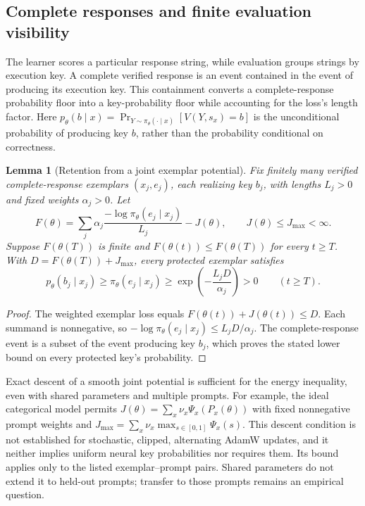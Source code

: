 \documentclass{article}
\newcommand{\enforcehalffinalproseline}{%
  \setlength{\parfillskip}{0pt plus .20\linewidth}}
\newcommand{\1}{\mathbf 1}
\newtheorem{lemma}{Lemma}[section]
\theoremstyle{remark}
\theoremstyle{definition}
\theoremstyle{plain}
\begin{document}
\subsection{Complete responses and finite evaluation visibility}
\label{app:theory-exemplar-bridge}

The learner scores a particular response string, while evaluation groups
strings by execution key. A complete verified response is an event contained in the event of
producing its execution key. This containment converts a complete-response
probability floor into a key-probability floor while accounting for the
loss's length factor. Here
$p_\theta(b\mid x)=\Pr_{Y\sim\pi_\theta(\cdot\mid x)}[V(Y,s_x)=b]$
is the unconditional probability of producing key $b$, rather than the
probability conditional on correctness.

\begin{lemma}[Retention from a joint exemplar potential]
\enforcehalffinalproseline
\label{lem:shared-exemplar-retention}
Fix finitely many verified complete-response exemplars $(x_j,e_j)$, each
realizing key $b_j$, with lengths $L_j>0$ and fixed weights $\alpha_j>0$.
Let
\[
 F(\theta)=\sum_j\alpha_j
 \frac{-\log\pi_\theta(e_j\mid x_j)}{L_j}-J(\theta),
 \qquad J(\theta)\le J_{\max}<\infty.
\]
Suppose $F(\theta(T))$ is finite and
$F(\theta(t))\le F(\theta(T))$ for every $t\ge T$. With
$D=F(\theta(T))+J_{\max}$, every protected exemplar satisfies
\[
 p_\theta(b_j\mid x_j)\ge\pi_\theta(e_j\mid x_j)
 \ge\exp\!\left(-\frac{L_jD}{\alpha_j}\right)>0
 \qquad(t\ge T).
\]
\end{lemma}
\begin{proof}
\enforcehalffinalproseline
The weighted exemplar loss equals $F(\theta(t))+J(\theta(t))\le D$.
Each summand is nonnegative, so
$-\log\pi_\theta(e_j\mid x_j)\le L_jD/\alpha_j$.
The complete-response event is a subset of the event producing key $b_j$,
which proves the stated lower bound on every protected key's probability.
\end{proof}

Exact descent of a smooth joint potential is sufficient for the energy
inequality, even with shared parameters and multiple prompts. For example,
the ideal categorical model permits
$J(\theta)=\sum_x\nu_x\Psi_x(P_x(\theta))$ with fixed nonnegative prompt
weights and $J_{\max}=\sum_x\nu_x\max_{s\in[0,1]}\Psi_x(s)$.
This descent condition is not established for stochastic, clipped,
alternating AdamW updates,
and it neither implies uniform neural key probabilities nor requires them.
Its bound applies only to the listed exemplar--prompt pairs. Shared
parameters do not extend it to held-out prompts; transfer to those prompts
remains an empirical question.
\end{document}
